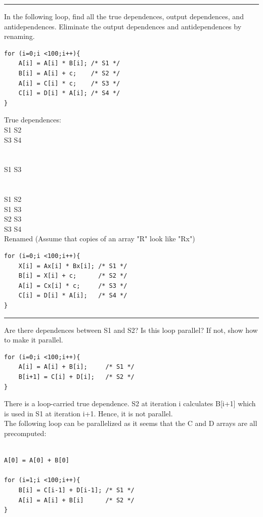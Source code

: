 \documentclass[11pt]{exam}
\newcounter{questionCounter}
\newcounter{partCounter}[questionCounter]
\newenvironment{namedquestion}[1]{%
    \addtocounter{questionCounter}{1}%
    \setcounter{partCounter}{0}%
    \vspace{.2in}%
        \noindent{\bf #1}%
    \vspace{0.3em} \hrule \vspace{.1in}%
}{}
\begin{document}
\begin{namedquestion}{Problem 4.14b}

In the following loop, find all the true dependences, output dependences, and antidependences. Eliminate the output dependences and antidependences by renaming. 

\begin{lstlisting}
for (i=0;i <100;i++){
    A[i] = A[i] * B[i]; /* S1 */ 
    B[i] = A[i] + c;    /* S2 */ 
    A[i] = C[i] * c;    /* S3 */ 
    C[i] = D[i] * A[i]; /* S4 */
}
\end{lstlisting}

True dependences:\\
S1  S2 \\
S3  S4\\
\\
\\
S1  S3 \\
\\
\\
S1  S2 \\
S1  S3 \\
S2  S3 \\
S3  S4 \\

Renamed (Assume that copies of an array "R" look like "Rx")

\begin{lstlisting}
for (i=0;i <100;i++){
    X[i] = Ax[i] * Bx[i]; /* S1 */ 
    B[i] = X[i] + c;      /* S2 */ 
    A[i] = Cx[i] * c;     /* S3 */ 
    C[i] = D[i] * A[i];   /* S4 */
}
\end{lstlisting}
\end{namedquestion}

\newpage 
\begin{namedquestion}{Problem 4.14c}

Are there dependences between S1 and S2? Is this loop parallel? If not, show how to make it parallel. 

\begin{lstlisting}
for (i=0;i <100;i++){ 
    A[i] = A[i] + B[i];     /* S1 */
    B[i+1] = C[i] + D[i];   /* S2 */ 
} 
\end{lstlisting}

There is a loop-carried true dependence. S2 at iteration i calculates B[i+1] which is used in S1 at iteration i+1. Hence, it is not parallel. \\

The following loop can be parallelized as it seems that the C and D arrays are all precomputed:

\begin{lstlisting}

A[0] = A[0] + B[0]

for (i=1;i <100;i++){ 
    B[i] = C[i-1] + D[i-1]; /* S1 */ 
    A[i] = A[i] + B[i]      /* S2 */ 
} 
\end{lstlisting}





\end{namedquestion}



\printbibliography
\end{document}
